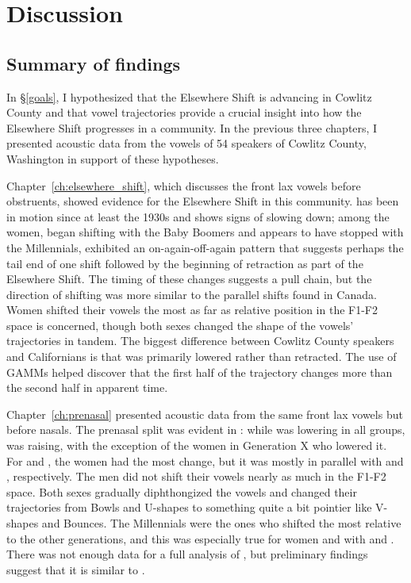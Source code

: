 \chapter{Discussion}
\label{ch:discussion}

\section{Summary of findings}

In \S\ref{goals}, I hypothesized that the Elsewhere Shift is advancing in Cowlitz County and that vowel trajectories provide a crucial insight into how the Elsewhere Shift progresses in a community. In the previous three chapters, I presented acoustic data from the vowels of 54 speakers of Cowlitz County, Washington in support of these hypotheses.

Chapter~\ref{ch:elsewhere_shift}, which discusses the front lax vowels before obstruents, showed evidence for the Elsewhere Shift in this community. \bat has been in motion since at least the 1930s and shows signs of slowing down; among the women, \bet began shifting with the Baby Boomers and appears to have stopped with the Millennials, \bit exhibited an on-again-off-again pattern that suggests perhaps the tail end of one shift followed by the beginning of retraction as part of the Elsewhere Shift. The timing of these changes suggests a pull chain, but the direction of shifting was more similar to the parallel shifts found in Canada. Women shifted their vowels the most as far as relative position in the F1-F2 space is concerned, though both sexes changed the shape of the vowels' trajectories in tandem. The biggest difference between Cowlitz County speakers and Californians is that \bat was primarily lowered rather than retracted. The use of GAMMs helped discover that the first half of the trajectory changes more than the second half in apparent time.

Chapter~\ref{ch:prenasal} presented acoustic data from the same front lax vowels but before nasals. The prenasal split was evident in \trap: while \bat was lowering in all groups, \ban was raising, with the exception of the women in Generation X who lowered it. For \ben and \bin, the women had the most change, but it was mostly in parallel with \bet and \bit, respectively. The men did not shift their vowels nearly as much in the F1-F2 space. Both sexes gradually diphthongized the vowels and changed their trajectories from Bowls and U-shapes to something quite a bit pointier like V-shapes and Bounces. The Millennials were the ones who shifted the most relative to the other generations, and this was especially true for women and with \bang and \bing. There was not enough data for a full analysis of \beng, but preliminary findings suggest that it is similar to \bang.

